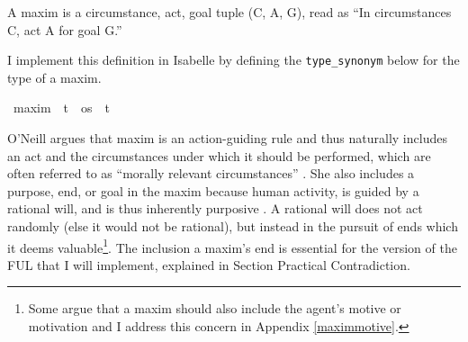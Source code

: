 \begin{isabellebody}
\begin{isamarkuptext}
\begin{definition}[Maxim]
    A maxim is a circumstance, act, goal tuple (C, A, G), read as ``In circumstances C, act A for goal G.''
\end{definition}

I implement this definition in Isabelle by defining the \texttt{type\_synonym} below for the type
of a maxim.%
\end{isamarkuptext}\isamarkuptrue%
\isamarkupfalse%
\ maxim\ {\isacharequal}\ {\isachardoublequoteopen}{\isacharparenleft}t\ {\isacharasterisk}\ os\ {\isacharasterisk}\ t{\isacharparenright}{\isachardoublequoteclose}\isanewline
%
%
\begin{isamarkuptext}%
O'Neill \cite[37]{actingonprinciple} argues that maxim 
is an action-guiding rule and thus naturally includes an act and the circumstances under which 
it should be performed, which are often referred to as ``morally relevant circumstances'' \citep[37]{actingonprinciple}. 
She also includes a purpose, end, or goal in the maxim because human activity, is guided by a rational will, 
and is thus inherently purposive \citep[4:428]{groundwork}. A rational will does not act randomly (else it would not be rational), 
but instead in the pursuit of ends which it deems valuable\footnote{Some argue that a maxim should also
include the agent's motive or motivation and I address this concern in Appendix \ref{maximmotive}.}. The inclusion a maxim's end is essential for the version of the FUL
that I will implement, explained in Section Practical Contradiction.


\end{isamarkuptext}
\end{isabellebody}
